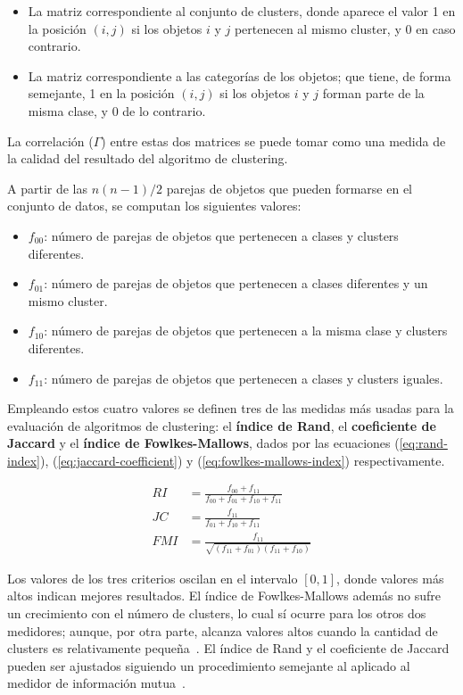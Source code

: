 \begin{itemize}
    \item La matriz correspondiente al conjunto de clusters, donde aparece el valor 1 en la posición $(i,j)$ si los objetos $i$ y $j$ pertenecen al mismo cluster, y 0 en caso contrario.
    \item La matriz correspondiente a las categorías de los objetos;
    que tiene, de forma semejante, 1 en la posición $(i, j)$ si los objetos $i$ y $j$ forman parte de la misma clase, y 0 de lo contrario.
\end{itemize}

La correlación ($\Gamma$) entre estas dos matrices se puede tomar como una medida de la calidad del resultado del algoritmo de clustering.

A partir de las $n(n-1)/2$ parejas de objetos que pueden formarse en el conjunto de datos, se computan los siguientes valores:

\begin{itemize}
    \item $f_{00}$: número de parejas de objetos que pertenecen a clases y clusters diferentes.
    \item $f_{01}$: número de parejas de objetos que pertenecen a clases diferentes y un mismo cluster.
    \item $f_{10}$: número de parejas de objetos que pertenecen a la misma clase y clusters diferentes.
    \item $f_{11}$: número de parejas de objetos que pertenecen a clases y clusters iguales.
\end{itemize}

Empleando estos cuatro valores se definen tres de las medidas más usadas para la evaluación de algoritmos de clustering: el \textbf{índice de Rand}, el \textbf{coeficiente de Jaccard} y el \textbf{índice de Fowlkes-Mallows}, dados por las ecuaciones (\ref{eq:rand-index}), (\ref{eq:jaccard-coefficient}) y (\ref{eq:fowlkes-mallows-index}) respectivamente.

\begin{align}
    \label{eq:rand-index}
    RI & = \frac{f_{00} + f_{11}}{f_{00}+f_{01}+f_{10}+f_{11}} \\
    \label{eq:jaccard-coefficient}
    JC & = \frac{f_{11}}{f_{01}+f_{10}+f_{11}} \\
    \label{eq:fowlkes-mallows-index}
    FMI & = \frac{f_{11}}{\sqrt{(f_{11}+f_{01})(f_{11}+f_{10})}}
\end{align}

Los valores de los tres criterios oscilan en el intervalo $[0,1]$, donde valores más altos indican mejores resultados.
El índice de Fowlkes-Mallows además no sufre un crecimiento con el número de clusters, lo cual sí ocurre para los otros dos medidores;
aunque, por otra parte, alcanza valores altos cuando la cantidad de clusters es relativamente pequeña~\cite{Wagner07}.
El índice de Rand y el coeficiente de Jaccard pueden ser ajustados siguiendo un procedimiento semejante al aplicado al medidor de información mutua~\cite{Vinh10, Wagner07}.


